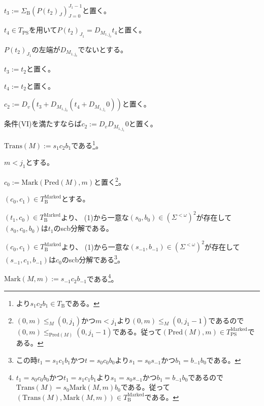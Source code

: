 \documentclass[dvipdfmx,uplatex]{jsarticle}
\theoremstyle{customnonumberbreakfortheorem}
\theoremstyle{customnonumberbreakforproof}
\begin{document}
\begin{nenumerate}
\begin{nenumerate}
\begin{nenumerate}
\begin{nenumerate}
\begin{nenumerate}
					\begin{nenumerate}
						\item \(t_3 := \Sigma_{\textrm{B}} (P(t_2)_J)_{J=0}^{J_1-1}\)と置く。
						\item \(t_4 \in T_{\textrm{PS}}\)を用いて\(P(t_2)_{J_1} = D_{M_{1,j_0}} t_4\)と置く。
					\end{nenumerate}
					\item \(P(t_2)_{J_1}\)の左端が\(D_{M_{1,j_0}}\)でないとする。
					\begin{nenumerate}
						\item \(t_3 := t_2\)と置く。
						\item \(t_4 := t_2\)と置く。
					\end{nenumerate}
					\item \(c_2 := D_v (t_3 + D_{M_{1,j_0}}(t_4 + D_{M_{1,j_1}} 0))\)と置く。
				\end{nenumerate}
			\end{nenumerate}
			\item 条件(VI)を満たすならば\(c_2 := D_v D_{M_{1,j_1}} 0\)と置く。
			\item \(\textrm{Trans}(M) := s_1 c_2 b_1\)である\footnote{より\(s_1 c_2 b_1 \in T_{\textrm{B}}\)である。}。
			\item \(m < j_1\)とする。
			\begin{nenumerate}
				\item \(c_0 := \textrm{Mark}(\textrm{Pred}(M),m)\)と置く\footnote{\((0,m) \leq_M (0,j_1)\)かつ\(m < j_1\)より\((0,m) \leq_M (0,j_1-1)\)であるので\((0,m) \leq_{\textrm{Pred}(M)} (0,j_1-1)\)である。従って\((\textrm{Pred}(M),m) \in T_{\textrm{PS}}^{\textrm{Marked}}\)である。}。
				\item \((c_0,c_1) \in T_{\textrm{B}}^{\textrm{Marked}}\)とする。
				\begin{nenumerate}
					\item \((t_1,c_0) \in T_{\textrm{B}}^{\textrm{Marked}}\)より、 (1)から一意な\((s_0,b_0) \in (\Sigma^{< \omega})^2\)が存在して\((s_0,c_0,b_0)\)は\(t_1\)のscb分解である。
					\item \((c_0,c_1) \in T_{\textrm{B}}^\textrm{Marked}\)より、 (1)から一意な\((s_{-1},b_{-1}) \in (\Sigma^{< \omega})^2\)が存在して\((s_{-1},c_1,b_{-1})\)は\(c_0\)のscb分解である\footnote{この時\(t_1 = s_1 c_1 b_1\)かつ\(t = s_0 c_0 b_0\)より\(s_1 = s_0 s_{-1}\)かつ\(b_1 = b_{-1} b_0\)である。}。
					\item \(\textrm{Mark}(M,m) := s_{-1} c_2 b_{-1}\)である\footnote{\(t_1 = s_0 c_0 b_0\)かつ\(t_1 = s_1 c_1 b_1\)より\(s_1 = s_0 s_{-1}\)かつ\(b_1 = b_{-1} b_0\)であるので\(\textrm{Trans}(M) = s_0 \textrm{Mark}(M,m) b_0\)である。従って\((\textrm{Trans}(M),\textrm{Mark}(M,m)) \in T_{\textrm{B}}^{\textrm{Marked}}\)である。}。

\end{nenumerate}
\end{nenumerate}
\end{nenumerate}
\end{nenumerate}
\end{nenumerate}
\end{document}
